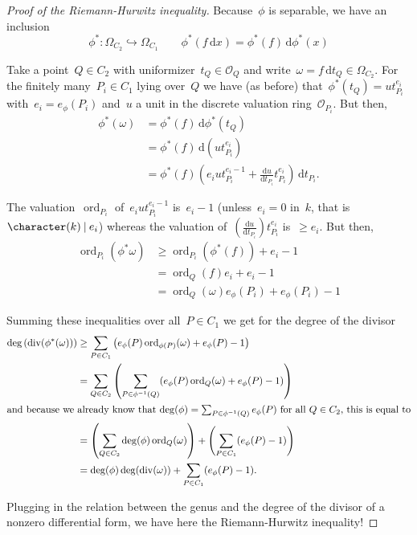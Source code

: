 \begin{proof}[Proof of the Riemann-Hurwitz inequality]
Because~$\phi$ is separable, we have an inclusion
\begin{equation}
  \phi^*\colon\Omega_{C_2} \hookrightarrow \Omega_{C_1} \qquad \phi^*(f\,\mathrm{d}x)=\phi^*(f)\,\mathrm{d} \phi^*(x)
\end{equation}

Take a point~$Q \in C_2$ with uniformizer~$t_Q \in \mathcal{O}_Q$ and write~$\omega = f\,\mathrm{d}t_Q \in \Omega_{C_2}$. For the finitely many~$P_i \in C_1$ lying over~$Q$ we have (as before) that~$\phi^*(t_Q) = u t_{P_i}^{e_i}$ with~$e_i = e_{\phi}(P_i)$ and~$u$ a unit in the discrete valuation ring~$\mathcal{O}_{P_i}$. But then,
\begin{equation}
  \begin{aligned}
    \phi^*(\omega) &= \phi^*(f)\,\mathrm{d} \phi^*(t_Q) \\
    &= \phi^*(f)\,\mathrm{d}(u t_{P_i}^{e_i}) \\
    &= \phi^*(f)\left(e_i u t_{P_i}^{e_i-1} + \frac{\mathrm{d}u}{\mathrm{d}t_{P_i}} t_{P_i}^{e_i}\right)\,\mathrm{d}t_{P_i}.
  \end{aligned}
\end{equation}

The valuation~$\operatorname{ord}_{P_i}$ of~$e_i u t_{P_i}^{e_i-1}$ is~$e_i-1$ (unless~$e_i=0$  in~$k$, that is~$\character(k) \divides e_i$) whereas the valuation of~$(\tfrac{\mathrm{d}u}{\mathrm{d}t_{P_i}}) t_{P_i}^{e_i}$ is~$\geq e_i$. But then,
\begin{equation}
  \begin{aligned}
    \operatorname{ord}_{P_i}(\phi^* \omega) &\geq \operatorname{ord}_{P_i}(\phi^*(f)) + e_i -1 \\
    &= \operatorname{ord}_Q(f) e_i + e_i - 1 \\
    &= \operatorname{ord}_Q(\omega) e_{\phi}(P_i) + e_{\phi}(P_i) -1
  \end{aligned}
\end{equation}

Summing these inequalities over all~$P \in C_1$ we get for the degree of the divisor
\begin{align}
  \deg\left( \operatorname{div}(\phi^*(\omega)) \right) &\geq \sum_{P \in C_1} \left(e_{\phi}(P) \operatorname{ord}_{\phi(P)}(\omega)+e_{\phi}(P) -1 \right) \\
  &=\sum_{Q \in C_2} \left( \sum_{P \in \phi^{-1}(Q)} (e_{\phi}(P) \operatorname{ord}_Q(\omega) + e_{\phi}(P) -1) \right) \\
  \intertext{and because we already know that~$\deg(\phi) = \sum_{P \in \phi^{-1}(Q)} e_{\phi}(P)$ for all~$Q \in C_2$, this is equal to}
  &=\left( \sum_{Q \in C_2} \deg(\phi) \operatorname{ord}_Q(\omega) \right)+\left( \sum_{P \in C_1} (e_{\phi}(P)-1) \right) \\
  &=\deg(\phi)\deg(\operatorname{div}(\omega)) + \sum_{P \in C_1} (e_{\phi}(P)-1).
\end{align}

Plugging in the relation between the genus and the degree of the divisor of a nonzero differential form, we have here the Riemann-Hurwitz inequality!
\end{proof}
